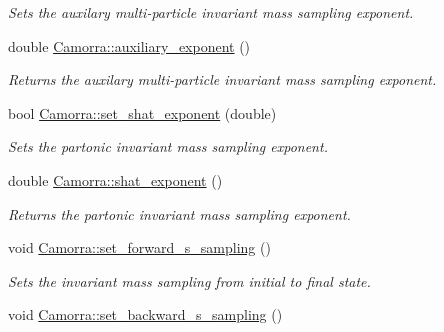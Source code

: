 \begin{DoxyCompactItemize}
\begin{DoxyCompactList}\small\item\em Sets the auxilary multi-\/particle invariant mass sampling exponent. \end{DoxyCompactList}\item 
\hypertarget{a00831_ae2574c2de709f48846ef66865357b28c}{
double \hyperlink{a00831_ae2574c2de709f48846ef66865357b28c}{Camorra::auxiliary\_\-exponent} ()}
\label{a00831_ae2574c2de709f48846ef66865357b28c}

\begin{DoxyCompactList}\small\item\em Returns the auxilary multi-\/particle invariant mass sampling exponent. \end{DoxyCompactList}\item 
\hypertarget{a00831_ad0de9bcec15b40b19cf2f7d8989781bf}{
bool \hyperlink{a00831_ad0de9bcec15b40b19cf2f7d8989781bf}{Camorra::set\_\-shat\_\-exponent} (double)}
\label{a00831_ad0de9bcec15b40b19cf2f7d8989781bf}

\begin{DoxyCompactList}\small\item\em Sets the partonic invariant mass sampling exponent. \end{DoxyCompactList}\item 
\hypertarget{a00831_aa340a7a07cd22c94638bcce39532a92b}{
double \hyperlink{a00831_aa340a7a07cd22c94638bcce39532a92b}{Camorra::shat\_\-exponent} ()}
\label{a00831_aa340a7a07cd22c94638bcce39532a92b}

\begin{DoxyCompactList}\small\item\em Returns the partonic invariant mass sampling exponent. \end{DoxyCompactList}\item 
\hypertarget{a00831_a93bc134d10fecad8d03b8479ffdf2ed2}{
void \hyperlink{a00831_a93bc134d10fecad8d03b8479ffdf2ed2}{Camorra::set\_\-forward\_\-s\_\-sampling} ()}
\label{a00831_a93bc134d10fecad8d03b8479ffdf2ed2}

\begin{DoxyCompactList}\small\item\em Sets the invariant mass sampling from initial to final state. \end{DoxyCompactList}\item 
\hypertarget{a00831_a0c39e77b66bcd1fa3e16a4f7693e47f6}{
void \hyperlink{a00831_a0c39e77b66bcd1fa3e16a4f7693e47f6}{Camorra::set\_\-backward\_\-s\_\-sampling} ()}
\label{a00831_a0c39e77b66bcd1fa3e16a4f7693e47f6}


\end{DoxyCompactItemize}
